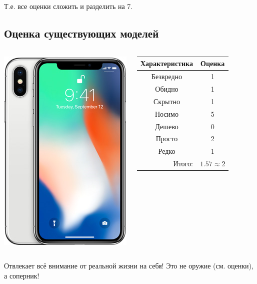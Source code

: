 Т.е. все оценки сложить и разделить на 7.

\subsection{Оценка существующих моделей}

\begin{frame}  %
    \begin{columns}
            \begin{center}
                \includegraphics[height=.8\textheight]{fig/iphoneX}
            \end{center}
            
            \begin{center}
                \begin{tabular}{c|c}
                    \hline\hline
                    Характеристика              & Оценка\\ \hline\hline
                    Безвредно                   & 1 \\
                    Обидно                      & 1 \\
                    Скрытно                     & 1 \\
                    Носимо                      & 5 \\
                    Дешево                      & 0 \\
                    Просто                      & 2 \\ 
                    Редко                       & 1 \\ \hline
                    \multicolumn{1}{r|}{Итого:} & $1.57\approx 2$ \\
                \end{tabular}
            \end{center}
    \end{columns}    
    
    Отвлекает \alert{всё} внимание от \alert{реальной жизни} на себя! Это \alert{не оружие} (см. оценки), а \alert{соперник}!
\end{frame}

